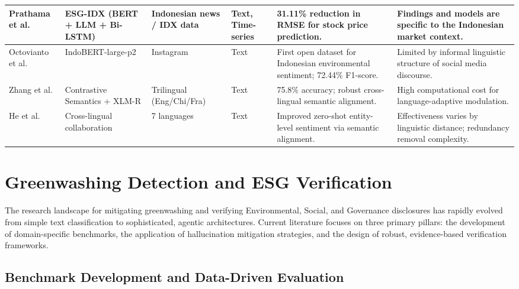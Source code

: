 \documentclass[english, online, cse, master]{dithesis}
\begin{document}
\begin{landscape}
\begin{table}[p]
\begin{tabularx}{\linewidth}{|p{1.8cm}|p{3cm}|p{3cm}|p{1.8cm}|X|X|}
Prathama et al.  \parencite{ubaidillah_ariq_prathama_a1856e2f} & ESG-IDX (BERT + LLM + Bi-LSTM) & Indonesian news / IDX data & Text, Time-series & 31.11\% reduction in RMSE for stock price prediction. & Findings and models are specific to the Indonesian market context. \\ \hline
Octovianto et al.  \parencite{christofer_octovianto_487e90aa} & IndoBERT-large-p2 & Instagram & Text & First open dataset for Indonesian environmental sentiment; 72.44\% F1-score. & Limited by informal linguistic structure of social media discourse. \\ \hline
Zhang et al.  \parencite{liman_zhang_ec332205} & Contrastive Semantics + XLM-R & Trilingual (Eng/Chi/Fra) & Text & 75.8\% accuracy; robust cross-lingual semantic alignment. & High computational cost for language-adaptive modulation. \\ \hline
He et al.  \parencite{association_for_computational_linguistics_2025_5a25f994} & Cross-lingual collaboration & 7 languages & Text & Improved zero-shot entity-level sentiment via semantic alignment. & Effectiveness varies by linguistic distance; redundancy removal complexity. \\ \hline
\end{tabularx}
\end{table}
\end{landscape}

\section{Greenwashing Detection and ESG Verification}

The research landscape for mitigating greenwashing and verifying Environmental, Social, and Governance disclosures has rapidly evolved from simple text classification to sophisticated, agentic architectures. Current literature focuses on three primary pillars: the development of domain-specific benchmarks, the application of hallucination mitigation strategies, and the design of robust, evidence-based verification frameworks.
\subsection{Benchmark Development and Data-Driven Evaluation}
\end{document}
